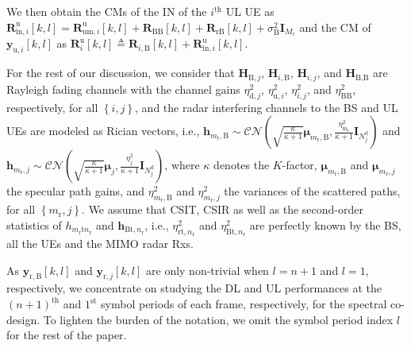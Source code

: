 \documentclass[9pt,journal]{IEEEtran}
\newcommand{\paren}[1]{\left({#1}\right)}
\newcommand{\bracket}[1]{{\left [{#1}\right ]}}
\newcommand{\braces}[1]{{\left\{ {#1}\right\}}}
\newcommand{\ith}[1]    {{#1}^{\underline{\text{th}}}}
\newcommand{\rr}{_\mathrm{r}}
\newcommand{\cc}{_\mathrm{c}}
\newcommand{\B}{\textrm{B}}
\begin{document}
We then obtain the CMs of the IN of the $\ith{i}$ UL UE as $\mathbf{R}^\textrm{u}_{\mathrm{in},i}\bracket{k,l}=\mathbf{R}^\textrm{u}_{\textrm{um}, i}\bracket{k,l}+\mathbf{R}_{\mathrm{BB}}\bracket{k,l}+\mathbf{R}_{\textrm{rB}}\bracket{k,l}+\sigma^2_{\textrm{B}}\mathbf{I}_{\mathit{M}\cc}$ and the CM of $\mathbf{y}_{\textrm{u},i}\bracket{k,l}$ as $\mathbf{R}^\mathrm{u}_{i}\bracket{k,l}\triangleq\mathbf{R}_{i,\B}\bracket{k,l}+\mathbf{R}^\textrm{u}_{\mathrm{in},i}\bracket{k,l}$. 

For the rest of our discussion, we consider that $\mathbf{H}_{\textrm{B},j}$, $\mathbf{H}_{i,\textrm{B}}$, $\mathbf{H}_{i,j}$, and $\mathbf{H}_{\textrm{B,B}}$ are Rayleigh fading channels with the channel gains $\eta^2_{\textrm{d},j}$, $\eta^2_{\textrm{u},i}$, $\eta^2_{i,j}$, and $\eta^2_{\textrm{BB}}$, respectively, for all $\braces{i,j}$, and the radar interfering channels to the BS and UL UEs are modeled as Rician vectors, i.e.,  $\mathbf{h}_{m\rr,\textrm{B}}\sim\mathcal{CN}\paren{\sqrt{\frac{\kappa}{\kappa+1}}\boldsymbol{\mu}_{m\rr,\textrm{B}},\frac{\eta^2_\mathrm{m\rr}}{\kappa+1}\mathbf{I}_{\mathit{N}^{\textrm{d}}_j}}$ and $\mathbf{h}_{m\rr, j}\sim\mathcal{CN}\paren{\sqrt{\frac{\kappa}{\kappa+1}}\boldsymbol{\mu}_j,\frac{\eta^2_j}{\kappa+1}\mathbf{I}_{\mathit{N}^{\textrm{d}}_j}}$, where $\kappa$ denotes the $K$-factor, $\boldsymbol{\mu}_{m\rr,\textrm{B}}$ and $\boldsymbol{\mu}_{m\rr,j}$ the specular path gains, and $\eta^2_{m\rr,\textrm{B}}$ and $\eta^2_{m\rr,j}$ the variances of the scattered paths, for all $\braces{m\rr,j}$.  We assume that CSIT, CSIR as well as the second-order statistics of $h_{m\rr\textrm{t}n\rr}$ and $\mathbf{h}_{\textrm{Bt},n\rr}$, i.e., $\eta^2_{\textrm{rt},n\rr}$ and $\eta^2_{\textrm{Bt},n\rr}$ are perfectly known by the BS, all the UEs and the MIMO radar Rxs. 

As $\mathbf{y}_{\mathrm{r,B}}\bracket{k,l}$ and $\mathbf{y}_{\mathrm{r},j}\bracket{k,l}$ are only non-trivial when $l=n+1$ and $l=1$, respectively, we concentrate on studying the DL and UL performances at the $\ith{\paren{n+1}}$ and $1^{\textrm{st}}$ symbol periods of each frame, respectively, for the spectral co-design. To lighten the burden of the notation, we omit the symbol period index $l$ for the rest of the paper.
\end{document}
